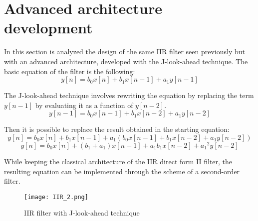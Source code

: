 \section{Advanced architecture development}
\graphicspath{{sec3/images/}}
In this section is analyzed the design of the same IIR filter seen previously but with an advanced architecture, developed with the J-look-ahead technique. The basic equation of the filter is the following:
$$ y[n] = b_0x[n] + b_1x[n-1] + a_1y[n-1]$$

The J-look-ahead technique involves rewriting the equation by replacing the term $y[n-1]$ by evaluating it as a function of $y[n-2]$.
$$ y[n-1] = b_0x[n-1] + b_1x[n-2] + a_1y[n-2]$$

Then it is possible to replace the result obtained in the starting equation:
$$ y[n] = b_0x[n] + b_1x[n-1] + a_1(b_0x[n-1] + b_1x[n-2] + a_1y[n-2])$$
$$ y[n] = b_0x[n] + (b_1 + a_1)x[n-1] + a_1b_1x[n-2] + {a_1}^{2}y[n-2]$$

While keeping the classical architecture of the IIR direct form II filter, the resulting equation can be implemented through the scheme of a second-order filter.

\begin{figure}[h]
	\center
	\texttt{[image: IIR\_2.png]}
	\caption{IIR filter with J-look-ahead technique}
	\label{fig:IIR_advanced}
\end{figure}






